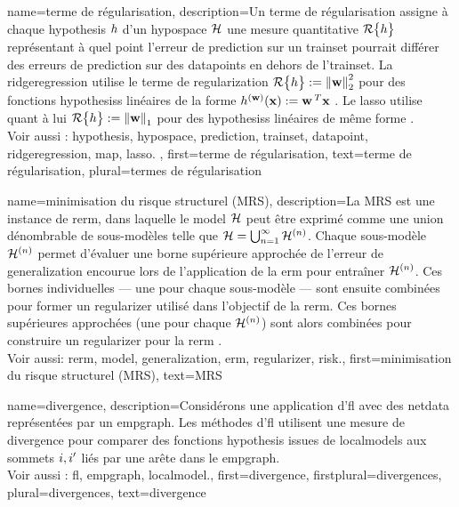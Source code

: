 {name={terme de régularisation}, 
	description={Un terme de régularisation 
		assigne à chaque \gls{hypothesis} $h$ d’un \gls{hypospace} $\mathcal{H}$ une mesure quantitative 
		$\mathcal{R}\big\{ h \big\}$ représentant à quel point l’erreur de \gls{prediction} sur un \gls{trainset} 
		pourrait différer des erreurs de \gls{prediction} sur des \glspl{datapoint} en dehors de l'\gls{trainset}. 
		La \gls{ridgeregression} utilise le terme de \gls{regularization} 
		$\regularizer{\hypothesis} \defeq \normgeneric{\weights}{2}^{2}$ pour des fonctions \glspl{hypothesis} linéaires 
		de la forme $h^{({\bf w})}({\bf x}) := {\bf w}\,^{T} {\bf x}$ \cite[Ch. 3]{MLBasics}. 
		Le \gls{lasso} utilise quant à lui $\regularizer{\hypothesis} \defeq \normgeneric{\weights}{1}$ 
		pour des \glspl{hypothesis} linéaires de même forme \cite[Ch. 3]{MLBasics}.
		\\
		Voir aussi : \gls{hypothesis}, \gls{hypospace}, \gls{prediction}, \gls{trainset}, \gls{datapoint}, \gls{ridgeregression}, \gls{map}, \gls{lasso}. },
	first={terme de régularisation},
	text={terme de régularisation}, plural={termes de régularisation}
}

{name={minimisation du risque structurel (MRS)}, 
	description={La MRS est une instance de \gls{rerm}, dans laquelle le \gls{model} $\mathcal{H}$ peut être exprimé comme une union dénombrable de sous-modèles telle que $\mathcal{H} = \bigcup_{n=1}^{\infty} \mathcal{H}^{(n)}$. 
		Chaque sous-modèle $\mathcal{H}^{(n)}$ permet d'évaluer une borne supérieure approchée de l’erreur de \gls{generalization} encourue lors de l’application de la \gls{erm} pour entraîner $\mathcal{H}^{(n)}$. 
		Ces bornes individuelles — une pour chaque sous-modèle — sont ensuite combinées pour former un \gls{regularizer} utilisé dans l’objectif de la \gls{rerm}. 
		Ces bornes supérieures approchées (une pour chaque $\mathcal{H}^{(n)}$) sont alors combinées pour construire un \gls{regularizer} pour la \gls{rerm} \cite[Sec.\ 7.2]{ShalevMLBook}.
		\\
		Voir aussi: \gls{rerm}, \gls{model}, \gls{generalization}, \gls{erm}, \gls{regularizer}, \gls{risk}.},
	first={minimisation du risque structurel (MRS)},
	text={MRS}
}

{name={divergence},
	description={Considérons une application d'\gls{fl} avec des \gls{netdata} 
		représentées par un \gls{empgraph}. Les méthodes d'\gls{fl} utilisent une mesure de divergence 
		pour comparer des fonctions \gls{hypothesis} issues de \glspl{localmodel} aux sommets $i,i'$ 
		liés par une arête dans le \gls{empgraph}.
		\\ 
		Voir aussi : \gls{fl}, \gls{empgraph}, \gls{localmodel}.},
	first={divergence},
	firstplural={divergences}, 
	plural={divergences}, 
	text={divergence}
}

